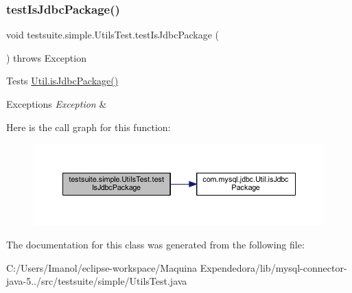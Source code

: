 \subsubsection{\texorpdfstring{test\+Is\+Jdbc\+Package()}{testIsJdbcPackage()}}
{\footnotesize\ttfamily void testsuite.\+simple.\+Utils\+Test.\+test\+Is\+Jdbc\+Package (\begin{DoxyParamCaption}{ }\end{DoxyParamCaption}) throws Exception}

Tests \mbox{\hyperlink{classcom_1_1mysql_1_1jdbc_1_1_util_a9cb2ac4a8521a60214e3186ad634b3b3}{Util.\+is\+Jdbc\+Package()}}


\begin{DoxyExceptions}{Exceptions}
{\em Exception} & \\
\hline
\end{DoxyExceptions}
Here is the call graph for this function\+:
\nopagebreak
\begin{figure}[H]
\begin{center}
\leavevmode
\includegraphics[width=350pt]{classtestsuite_1_1simple_1_1_utils_test_acdd7d8143bc1dede650e3c5991d92193_cgraph}
\end{center}
\end{figure}


The documentation for this class was generated from the following file\+:\begin{DoxyCompactItemize}
\item 
C\+:/\+Users/\+Imanol/eclipse-\/workspace/\+Maquina Expendedora/lib/mysql-\/connector-\/java-\/5../src/testsuite/simple/Utils\+Test.\+java\end{DoxyCompactItemize}
